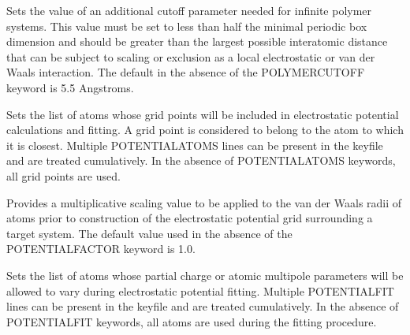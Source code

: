 \documentclass[letterpaper,11pt,english]{sphinxmanual}
\begin{document}
\ignorespaces {}\label{\detokenize{text/keywords:key-polymer-cutoff}}\begin{description}
\sphinxAtStartPar
Sets the value of an additional cutoff parameter needed for infinite polymer systems. This value must be set to less than half the minimal periodic box dimension and should be greater than the largest possible interatomic distance that can be subject to scaling or exclusion as a local electrostatic or van der Waals interaction. The default in the absence of the POLYMER\sphinxhyphen{}CUTOFF keyword is 5.5 Angstroms.

\end{description}

\ignorespaces {}\label{\detokenize{text/keywords:key-potential-atoms}}\begin{description}
\sphinxAtStartPar
Sets the list of atoms whose grid points will be included in electrostatic potential calculations and fitting. A grid point is considered to belong to the atom to which it is closest. Multiple POTENTIAL\sphinxhyphen{}ATOMS lines can be present in the keyfile and are treated cumulatively. In the absence of POTENTIAL\sphinxhyphen{}ATOMS keywords, all grid points are used.

\end{description}

\ignorespaces {}\label{\detokenize{text/keywords:key-potential-factor}}\begin{description}
\sphinxAtStartPar
Provides a multiplicative scaling value to be applied to the van der Waals radii of atoms prior to construction of the electrostatic potential grid surrounding a target system. The default value used in the absence of the POTENTIAL\sphinxhyphen{}FACTOR keyword is 1.0.

\end{description}

\ignorespaces {}\label{\detokenize{text/keywords:key-potential-fit}}\begin{description}
\sphinxAtStartPar
Sets the list of atoms whose partial charge or atomic multipole parameters will be allowed to vary during electrostatic potential fitting. Multiple POTENTIAL\sphinxhyphen{}FIT lines can be present in the keyfile and are treated cumulatively. In the absence of POTENTIAL\sphinxhyphen{}FIT keywords, all atoms are used during the fitting procedure.

\end{description}
\end{document}
